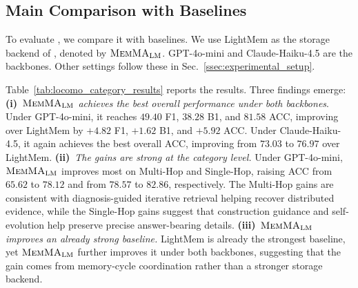 \subsection{Main Comparison with Baselines}
\label{ssec:evaluation_main_results}
To evaluate \method, we compare it with baselines.
We use LightMem as the storage backend of \method, denoted by $\textnormal{\textsc{MemMA}}_{\mathrm{LM}}$. GPT-4o-mini and Claude-Haiku-4.5 are the backbones. 
Other settings follow these in Sec.~\ref{ssec:experimental_setup}.


Table~\ref{tab:locomo_category_results} reports the results. Three findings emerge:
\textbf{(i)}~\emph{$\textnormal{\textsc{MemMA}}_{\mathrm{LM}}$ achieves the best overall performance under both backbones}.
Under GPT-4o-mini, it reaches $49.40$ F1, $38.28$ B1, and $81.58$ ACC, improving over LightMem by $+4.82$ F1, $+1.62$ B1, and $+5.92$ ACC.
Under Claude-Haiku-4.5, it again achieves the best overall ACC, improving from $73.03$ to $76.97$ over LightMem.
\textbf{(ii)}~\emph{The gains are strong at the category level.}
Under GPT-4o-mini, $\textnormal{\textsc{MemMA}}_{\mathrm{LM}}$ improves most on Multi-Hop and Single-Hop, raising ACC from $65.62$ to $78.12$ and from $78.57$ to $82.86$, respectively.
The Multi-Hop gains are consistent with diagnosis-guided iterative retrieval helping recover distributed evidence, while the Single-Hop gains suggest that construction guidance and self-evolution help preserve precise answer-bearing details.
\textbf{(iii)}~\emph{$\textnormal{\textsc{MemMA}}_{\mathrm{LM}}$ improves an already strong baseline.}
LightMem is already the strongest baseline, yet $\textnormal{\textsc{MemMA}}_{\mathrm{LM}}$ further improves it under both backbones, suggesting that the gain comes from memory-cycle coordination rather than a stronger storage backend.

